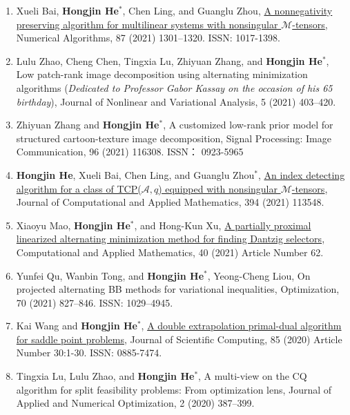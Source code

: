 \begin{enumerate}
	\item Xueli Bai, {\bf\color{black}Hongjin He}$^*$, Chen Ling, and Guanglu Zhou, \href{https://doi.org/10.1007/s11075-020-01008-2}{\color{blue}A nonnegativity preserving algorithm for multilinear systems with nonsingular ${\mathcal M}$-tensors}, Numerical Algorithms, 87 (2021) 1301--1320.  ISSN: 1017-1398.
		 
	 \item Lulu Zhao, Cheng Chen, Tingxia Lu, Zhiyuan Zhang, and {\bf\color{black}Hongjin He}$^*$, Low patch-rank image decomposition using alternating minimization algorithms ({\color{red}\it Dedicated to Professor Gabor Kassay on the occasion of his 65 birthday}), Journal of Nonlinear and Variational Analysis, 5 (2021) 403--420.
	 
    \item Zhiyuan Zhang and {\bf\color{black}Hongjin He}$^*$, A customized low-rank prior model for structured cartoon-texture image decomposition, Signal Processing: Image Communication, 96 (2021) 116308. ISSN： 0923-5965
	    
	\item {\bf\color{black}Hongjin He}, Xueli Bai, Chen Ling, and Guanglu Zhou$^*$,  \href{https://doi.org/10.1016/j.cam.2021.113548}{An index detecting algorithm for a class of TCP($\mathcal{A},q$) equipped with nonsingular $\mathcal{M}$-tensors}, Journal of Computational and Applied Mathematics,  394 (2021) 113548.
	
	\item Xiaoyu Mao, {\bf\color{black}Hongjin He}$^*$, and Hong-Kun Xu, \href{https://doi.org/10.1007/s40314-021-01450-5}{A partially proximal linearized alternating minimization method for finding Dantzig selectors}, Computational and Applied Mathematics, 40 (2021) Article Number 62.
	
	\item Yunfei Qu, Wanbin Tong, and  {\bf\color{black}Hongjin He}$^*$, Yeong-Cheng Liou, On projected alternating BB methods for variational inequalities, Optimization, 70 (2021) 827--846. ISSN: 1029--4945.

	
	\item Kai Wang and {\bf\color{black}Hongjin He}$^*$, \href{https://doi.org/10.1007/s10915-020-01330-w}{\color{blue}A double extrapolation primal-dual algorithm for saddle point problems}, Journal of Scientific Computing, 85 (2020) Article Number 30:1-30.  ISSN: 0885-7474.

\item Tingxia Lu, Lulu Zhao, and {\bf\color{black}Hongjin He}$^*$, A multi-view on the CQ algorithm for split feasibility problems: From optimization lens, Journal of Applied and Numerical Optimization, 2 (2020) 387--399.
    

\end{enumerate}
